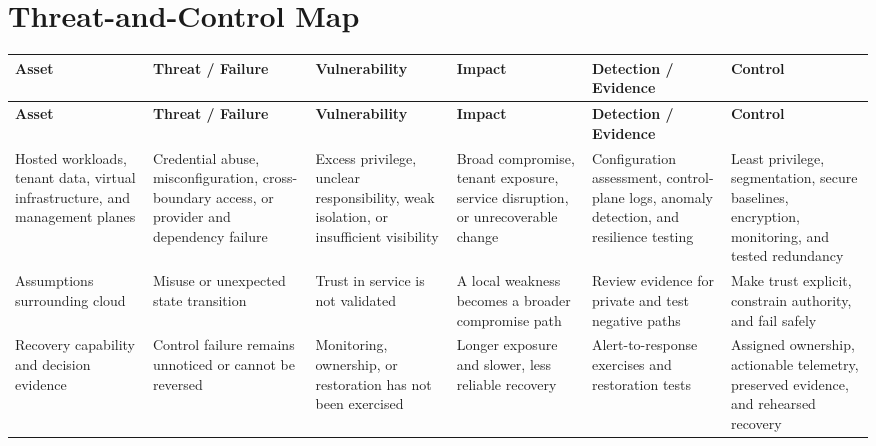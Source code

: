 \documentclass[11pt,letterpaper]{article}
\begin{document}
\section*{Threat-and-Control Map}
\begingroup\scriptsize\setlength{\tabcolsep}{2pt}
\begin{longtable}{>{\raggedright\arraybackslash}p{}>{\raggedright\arraybackslash}p{}>{\raggedright\arraybackslash}p{}>{\raggedright\arraybackslash}p{}>{\raggedright\arraybackslash}p{}>{\raggedright\arraybackslash}p{}}
\toprule\rowcolor{Navy}\color{white}\textbf{Asset} & \color{white}\textbf{Threat / Failure} & \color{white}\textbf{Vulnerability} & \color{white}\textbf{Impact} & \color{white}\textbf{Detection / Evidence} & \color{white}\textbf{Control}\\\midrule
\endfirsthead
\toprule\rowcolor{Navy}\color{white}\textbf{Asset} & \color{white}\textbf{Threat / Failure} & \color{white}\textbf{Vulnerability} & \color{white}\textbf{Impact} & \color{white}\textbf{Detection / Evidence} & \color{white}\textbf{Control}\\\midrule
\endhead
Hosted workloads, tenant data, virtual infrastructure, and management planes & Credential abuse, misconfiguration, cross-boundary access, or provider and dependency failure & Excess privilege, unclear responsibility, weak isolation, or insufficient visibility & Broad compromise, tenant exposure, service disruption, or unrecoverable change & Configuration assessment, control-plane logs, anomaly detection, and resilience testing & Least privilege, segmentation, secure baselines, encryption, monitoring, and tested redundancy\\\midrule
Assumptions surrounding cloud & Misuse or unexpected state transition & Trust in service is not validated & A local weakness becomes a broader compromise path & Review evidence for private and test negative paths & Make trust explicit, constrain authority, and fail safely\\\midrule
Recovery capability and decision evidence & Control failure remains unnoticed or cannot be reversed & Monitoring, ownership, or restoration has not been exercised & Longer exposure and slower, less reliable recovery & Alert-to-response exercises and restoration tests & Assigned ownership, actionable telemetry, preserved evidence, and rehearsed recovery\\\midrule
\bottomrule
\end{longtable}
\endgroup
\end{document}
